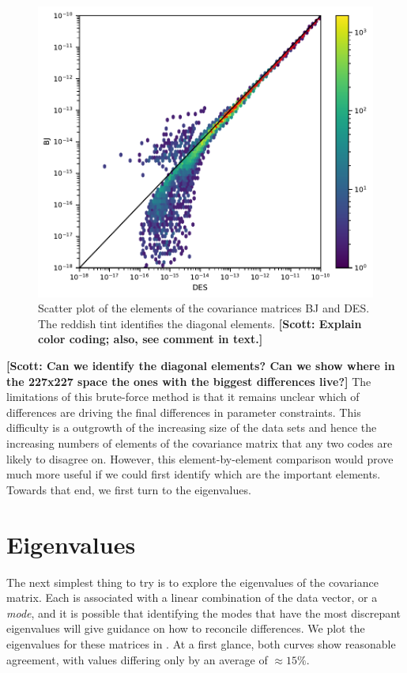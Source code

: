 \documentclass[twocolumn]{\docclass}
\newcommand\scott[1]{{\bf [Scott: #1]}}
\begin{document}
	\begin{figure}
		\includegraphics[width=0.9\columnwidth]{One-to-one-Y1_DES-BJ.pdf}
		\caption{Scatter plot of the elements of the covariance matrices BJ and DES. The reddish tint identifies the diagonal elements. \scott{Explain color coding; also, see comment in text.}
			\label{fig:one-to-one}}
	\end{figure}
	
\scott{Can we identify the diagonal elements? Can we show where in the 227x227 space the ones with the biggest differences live?} The limitations of this brute-force method is that it remains unclear which of differences are driving the final differences in parameter constraints. This difficulty is a outgrowth of the increasing size of the data sets and hence the increasing numbers of elements of the covariance matrix that any two codes are likely to disagree on. However, this element-by-element comparison would prove much more useful if we could first identify which are the important elements. Towards that end, we first turn to the eigenvalues.
	
\section{Eigenvalues}
	
	The next simplest thing to try is to explore the eigenvalues of the covariance matrix. Each is associated with a linear combination of the data vector, or a \emph{mode}, and it is possible that identifying the modes that have the most discrepant eigenvalues will give guidance on how to reconcile differences.  We plot the eigenvalues for these matrices in . At a first glance, both curves show reasonable agreement, with values differing only by an average of $\approx 15\%$.
	
\end{document}
